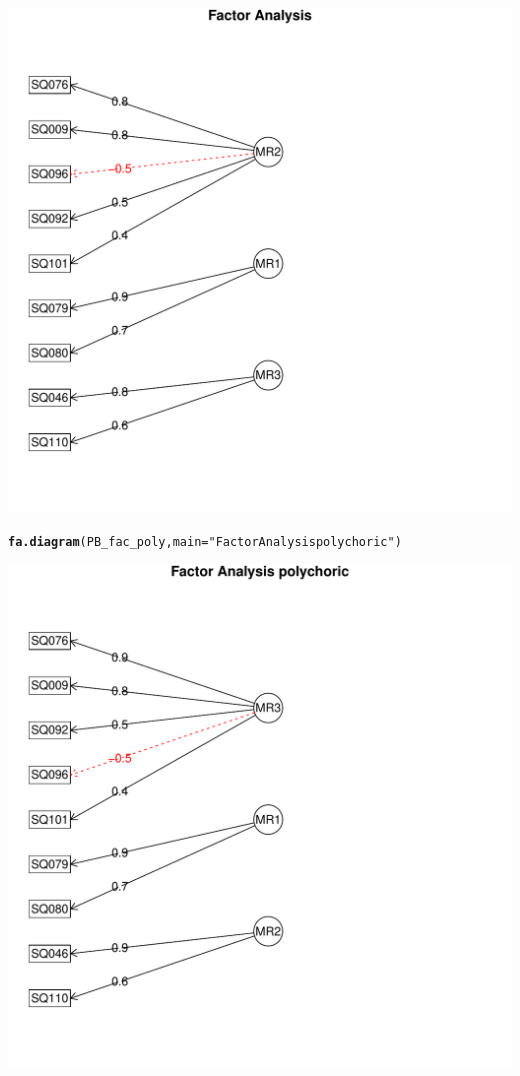 \documentclass{article}\usepackage[]{graphicx}\usepackage[]{color}
\makeatletter
\def\maxwidth{ %
  \ifdim\Gin@nat@width>\linewidth
    \linewidth
  \else
    \Gin@nat@width
  \fi
}
\newcommand{\hlstr}[1]{\textcolor[rgb]{0.192,0.494,0.8}{#1}}%
\newcommand{\hlstd}[1]{\textcolor[rgb]{0.345,0.345,0.345}{#1}}%
\newcommand{\hlkwc}[1]{\textcolor[rgb]{0.333,0.667,0.333}{#1}}%
\newcommand{\hlkwd}[1]{\textcolor[rgb]{0.737,0.353,0.396}{\textbf{#1}}}%
\newenvironment{kframe}{%
 \def\at@end@of@kframe{}%
 \ifinner\ifhmode%
  \def\at@end@of@kframe{\end{minipage}}%
  \begin{minipage}{\columnwidth}%
 \fi\fi%
 \def\FrameCommand##1{\hskip\@totalleftmargin \hskip-\fboxsep
 \colorbox{shadecolor}{##1}\hskip-\fboxsep
     \hskip-\linewidth \hskip-\@totalleftmargin \hskip\columnwidth}%
 \MakeFramed {\advance\hsize-\width
   \@totalleftmargin\z@ \linewidth\hsize
   \@setminipage}}%
 {\par\unskip\endMakeFramed%
 \at@end@of@kframe}
\newenvironment{knitrout}{}{} %
\makeatother
\begin{document}
\begin{knitrout}
\begin{kframe}
\begin{alltt}
\end{alltt}
\end{kframe}
\includegraphics[width=\maxwidth]{figure/psych-3} 
\begin{kframe}\begin{alltt}
\hlkwd{fa.diagram}\hlstd{(PB_fac_poly,} \hlkwc{main} \hlstd{=}\hlstr{"Factor Analysis polychoric"}\hlstd{)}
\end{alltt}
\end{kframe}
\includegraphics[width=\maxwidth]{figure/psych-4} 

\end{knitrout}
\end{document}
